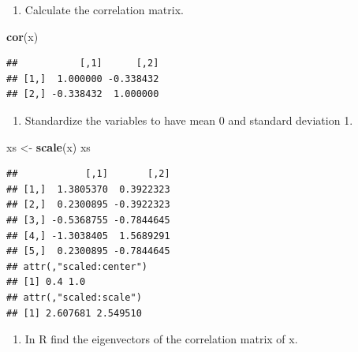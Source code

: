\documentclass[]{article}
\newenvironment{Shaded}{\begin{snugshade}}{\end{snugshade}}
\newcommand{\DecValTok}[1]{\textcolor[rgb]{0.00,0.00,0.81}{#1}}
\newcommand{\KeywordTok}[1]{\textcolor[rgb]{0.13,0.29,0.53}{\textbf{#1}}}
\newcommand{\NormalTok}[1]{#1}
\newcommand{\OperatorTok}[1]{\textcolor[rgb]{0.81,0.36,0.00}{\textbf{#1}}}
\newcommand{\StringTok}[1]{\textcolor[rgb]{0.31,0.60,0.02}{#1}}
\providecommand{\tightlist}{%
  \setlength{\itemsep}{0pt}\setlength{\parskip}{0pt}}
\begin{document}
\begin{enumerate}
\def\labelenumi{(\alph{enumi})}
\setcounter{enumi}{1}
\tightlist
\item
  Calculate the correlation matrix.
\end{enumerate}

\begin{Shaded}
\begin{Highlighting}[]
\KeywordTok{cor}\NormalTok{(x)}
\end{Highlighting}
\end{Shaded}

\begin{verbatim}
##           [,1]      [,2]
## [1,]  1.000000 -0.338432
## [2,] -0.338432  1.000000
\end{verbatim}

\begin{enumerate}
\def\labelenumi{(\alph{enumi})}
\setcounter{enumi}{2}
\tightlist
\item
  Standardize the variables to have mean 0 and standard deviation 1.
\end{enumerate}

\begin{Shaded}
\begin{Highlighting}[]
\NormalTok{xs <-}\StringTok{ }\KeywordTok{scale}\NormalTok{(x)}
\NormalTok{xs}
\end{Highlighting}
\end{Shaded}

\begin{verbatim}
##            [,1]       [,2]
## [1,]  1.3805370  0.3922323
## [2,]  0.2300895 -0.3922323
## [3,] -0.5368755 -0.7844645
## [4,] -1.3038405  1.5689291
## [5,]  0.2300895 -0.7844645
## attr(,"scaled:center")
## [1] 0.4 1.0
## attr(,"scaled:scale")
## [1] 2.607681 2.549510
\end{verbatim}

\begin{enumerate}
\def\labelenumi{(\alph{enumi})}
\setcounter{enumi}{3}
\tightlist
\item
  In R find the eigenvectors of the correlation matrix of x.
\end{enumerate}

\begin{Shaded}
\end{Shaded}
\end{document}
